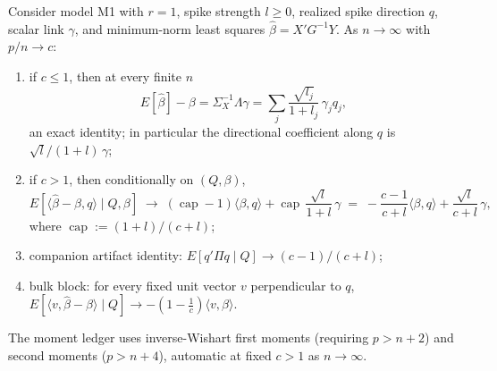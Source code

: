 \begin{theorem}\label{thm:captureR1}
Consider model M1 with $r=1$, spike strength $l\ge 0$, realized spike direction $q$, scalar link $\gamma$, and minimum-norm least squares $\hat\beta=X'G^{-1}Y$. As $n\to\infty$ with $p/n\to c$:
\begin{enumerate}
\item[(i)] if $c\le 1$, then at every finite $n$
\[
E[\hat\beta]-\beta=\Sigma_X^{-1}\Lambda\gamma
=\sum_j\frac{\sqrt{l_j}}{1+l_j}\,\gamma_j q_j,
\]
an exact identity; in particular the directional coefficient along $q$ is $\sqrt{l}/(1+l)\,\gamma$;
\item[(ii)] if $c>1$, then conditionally on $(Q,\beta)$,
\[
E[\langle\hat\beta-\beta,q\rangle\mid Q,\beta]
\;\to\;(\operatorname{cap}-1)\langle\beta,q\rangle+\operatorname{cap}\,\frac{\sqrt{l}}{1+l}\,\gamma
\;=\;-\frac{c-1}{c+l}\langle\beta,q\rangle+\frac{\sqrt{l}}{c+l}\,\gamma,
\]
where $\operatorname{cap}:=(1+l)/(c+l)$;
\item[(iii)] companion artifact identity: $E[q'\Pi q\mid Q]\to(c-1)/(c+l)$;
\item[(iv)] bulk block: for every fixed unit vector $v$ perpendicular to $q$,
$E[\langle v,\hat\beta-\beta\rangle\mid Q]\to-(1-\tfrac{1}{c})\langle v,\beta\rangle$.
\end{enumerate}
The moment ledger uses inverse-Wishart first moments (requiring $p>n+2$) and second moments ($p>n+4$), automatic at fixed $c>1$ as $n\to\infty$.
\end{theorem}

